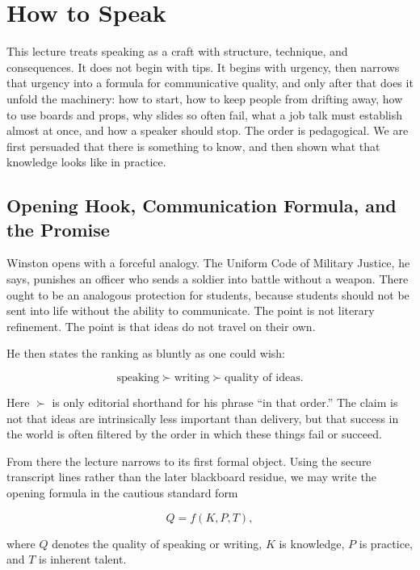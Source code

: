 \chapter{How to Speak}

This lecture treats speaking as a craft with structure, technique, and consequences. It does not begin with tips. It begins with urgency, then narrows that urgency into a formula for communicative quality, and only after that does it unfold the machinery: how to start, how to keep people from drifting away, how to use boards and props, why slides so often fail, what a job talk must establish almost at once, and how a speaker should stop. The order is pedagogical. We are first persuaded that there is something to know, and then shown what that knowledge looks like in practice.

\section{Opening Hook, Communication Formula, and the Promise}

Winston opens with a forceful analogy. The Uniform Code of Military Justice, he says, punishes an officer who sends a soldier into battle without a weapon. There ought to be an analogous protection for students, because students should not be sent into life without the ability to communicate. The point is not literary refinement. The point is that ideas do not travel on their own.

He then states the ranking as bluntly as one could wish:

\begin{equation}
\text{speaking} \succ \text{writing} \succ \text{quality of ideas}.
\end{equation}

Here \(\succ\) is only editorial shorthand for his phrase ``in that order.'' The claim is not that ideas are intrinsically less important than delivery, but that success in the world is often filtered by the order in which these things fail or succeed.

From there the lecture narrows to its first formal object. Using the secure transcript lines rather than the later blackboard residue, we may write the opening formula in the cautious standard form

\begin{equation}
Q = f(K,P,T),
\end{equation}

where \(Q\) denotes the quality of speaking or writing, \(K\) is knowledge, \(P\) is practice, and \(T\) is inherent talent.

